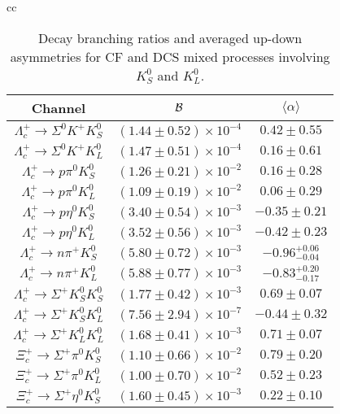 \begin{table}
	\caption{Decay branching ratios and averaged up-down asymmetries for CF and DCS mixed processes involving $K_{S}^{0}$ and $K_{L}^{0}$.}\label{klks}
	{\scriptsize
		\begin{tabular}{cc}
			\begin{tabular}[t]{|c|c|c|}
				\hline
				Channel  & ${\cal B}$ &$\langle \alpha \rangle$\\
				\hline
				$ \Lambda_{c}^{+} \to \Sigma^{0} K^{+} K_{S}^{0} $ & $(1.44\pm 0.52)\times 10^{-4}$ &$       0.42 \pm       0.55 $ \\
				$ \Lambda_{c}^{+} \to \Sigma^{0} K^{+} K_{L}^{0} $ &$(1.47\pm 0.51)\times 10^{-4}$ &$       0.16 \pm       0.61 $ \\
				$ \Lambda_{c}^{+} \to p \pi^{0} K_{S}^{0} $ &$(1.26\pm 0.21)\times 10^{-2}$ &$       0.16 \pm       0.28 $ \\
				$ \Lambda_{c}^{+} \to p \pi^{0} K_{L}^{0} $ & $(1.09\pm 0.19)\times 10^{-2}$&$       0.06 \pm       0.29 $ \\
				$ \Lambda_{c}^{+} \to p \eta^{0} K_{S}^{0} $ &$(3.40\pm 0.54)\times 10^{-3}$& $      -0.35 \pm       0.21 $ \\
				$ \Lambda_{c}^{+} \to p \eta^{0} K_{L}^{0} $ &$(3.52\pm 0.56)\times 10^{-3}$ &$      -0.42 \pm       0.23 $ \\
				$ \Lambda_{c}^{+} \to n \pi^{+} K_{S}^{0} $ &$(5.80\pm 0.72)\times 10^{-3}$ &$      -0.96 ^{+0.06}_{-0.04} $ \\
				$ \Lambda_{c}^{+} \to n \pi^{+} K_{L}^{0} $ &$(5.88\pm 0.77)\times 10^{-3}$& $      -0.83 ^{+0.20}_{-0.17} $ \\
				\hline
				$ \Lambda_{c}^{+} \to \Sigma^{+} K_{S}^{0} K_{S}^{0} $ &$(1.77\pm 0.42)\times 10^{-3}$ &$       0.69 \pm       0.07 $ \\
				$ \Lambda_{c}^{+} \to \Sigma^{+} K_{S}^{0} K_{L}^{0} $ &$(7.56\pm 2.94)\times 10^{-7}$ &$      -0.44 \pm       0.32 $ \\
				$ \Lambda_{c}^{+} \to \Sigma^{+} K_{L}^{0} K_{L}^{0} $ &$(1.68\pm 0.41)\times 10^{-3}$ &$       0.71 \pm       0.07 $ \\
				\hline
				$ \Xi_{c}^{+} \to \Sigma^{+} \pi^{0} K_{S}^{0} $ &$(1.10\pm 0.66)\times 10^{-2}$& $       0.79 \pm       0.20 $ \\
				$ \Xi_{c}^{+} \to \Sigma^{+} \pi^{0} K_{L}^{0} $ & $(1.00\pm 0.70)\times 10^{-2}$&$       0.52 \pm       0.23 $ \\
				$ \Xi_{c}^{+} \to \Sigma^{+} \eta^{0} K_{S}^{0} $ &$(1.60\pm 0.45)\times 10^{-3}$& $       0.22 \pm       0.10 $ \\

\end{tabular}
\end{tabular}}
\end{table}
